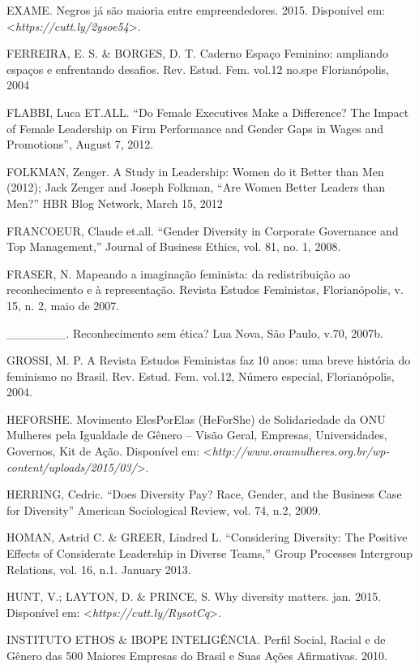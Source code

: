 \begin{Parskip}
EXAME. Negros já são maioria entre empreendedores. 2015.
Disponível em: \textless{}\emph{https://cutt.ly/2ysoe54}\textgreater{}.

FERREIRA, E. S. \& BORGES, D. T. Caderno Espaço Feminino: ampliando
espaços e enfrentando desafios. Rev. Estud. Fem. vol.12 no.spe
Florianópolis, 2004

FLABBI, Luca ET.ALL. ``Do Female Executives Make a Difference? The
Impact of Female Leadership on Firm Performance and Gender Gaps in Wages
and Promotions'', August 7, 2012.

FOLKMAN, Zenger. A Study in Leadership: Women do it Better than Men
(2012); Jack Zenger and Joseph Folkman, ``Are Women Better Leaders than
Men?'' HBR Blog Network, March 15, 2012

FRANCOEUR, Claude et.all. ``Gender Diversity in Corporate Governance and
Top Management,'' Journal of Business Ethics, vol. 81, no. 1, 2008.

FRASER, N. Mapeando a imaginação feminista: da redistribuição ao
reconhecimento e à representação. Revista Estudos Feministas,
Florianópolis, v. 15, n. 2, maio de 2007.

\_\_\_\_\_\_\_. Reconhecimento sem ética? Lua Nova, São Paulo, v.70,
2007b.

GROSSI, M. P. A Revista Estudos Feministas faz 10 anos: uma breve
história do feminismo no Brasil. Rev. Estud. Fem. vol.12, Número
especial, Florianópolis, 2004.

HEFORSHE. Movimento ElesPorElas (HeForShe) de Solidariedade da ONU
Mulheres pela Igualdade de Gênero -- Visão Geral, Empresas,
Universidades, Governos, Kit de Ação.
Disponível em: \textless{}\emph{http://www.onumulheres.org.br/wp-content/uploads/2015/03/}\textgreater{}.

HERRING, Cedric. ``Does Diversity Pay? Race, Gender, and the Business
Case for Diversity'' American Sociological Review, vol. 74, n.2, 2009.

HOMAN, Astrid C. \& GREER, Lindred L. ``Considering Diversity: The
Positive Effects of Considerate Leadership in Diverse Teams,'' Group
Processes Intergroup Relations, vol. 16, n.1. January 2013.

HUNT, V.; LAYTON, D. \& PRINCE, S. Why diversity matters. jan. 2015.
Disponível em: \textless{}\emph{https://cutt.ly/RysotCq}\textgreater{}.

INSTITUTO ETHOS \& IBOPE INTELIGÊNCIA. Perfil Social, Racial e de Gênero
das 500 Maiores Empresas do Brasil e Suas Ações Afirmativas. 2010.


\end{Parskip}
